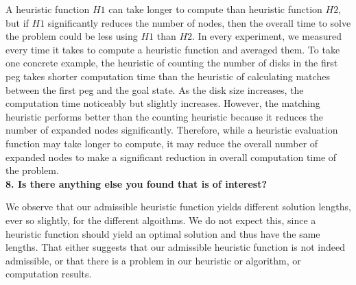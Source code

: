 A heuristic function $H1$ can take longer to compute than heuristic function $H2$, but if $H1$ significantly reduces the number of nodes, then the overall time to solve the problem could be less using $H1$ than $H2$. In every experiment, we measured every time it takes to compute a heuristic function and averaged them. To take one concrete example, the heuristic of counting the number of disks in the first peg takes shorter computation time than the heuristic of calculating matches between the first peg and the goal state. As the disk size increases, the computation time noticeably but slightly increases. However, the matching heuristic performs better than the counting heuristic because it reduces the number of expanded nodes significantly. Therefore, while a heuristic evaluation function may take longer to compute, it may reduce the overall number of expanded nodes to make a significant reduction in overall computation time of the problem.\\

\textbf{8. Is there anything else you found that is of interest?}

We observe that our admissible heuristic function yields different solution lengths, ever so slightly, for the different algoithms. We do not expect this, since a heuristic function should yield an optimal solution and thus have the same lengths. That either suggests that our admissible heuristic function is not indeed admissible, or that there is a problem in our heuristic or algorithm, or computation results.
